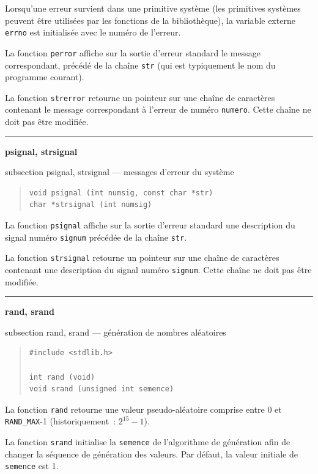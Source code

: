 \documentclass [twoside] {report}
\newcommand {\primitive} [1]
    {
	\phantomsection
	{\large \textbf {#1}}
	\addcontentsline {toc} {subsection} {#1}
    }
\newcommand {\separation}
    {
	\vspace {5mm}
	\nopagebreak
	\hrule
    }
\begin{document}
Lorsqu'une erreur survient dans une primitive système (les
primitives systèmes peuvent être utilisées par les fonctions de la
bibliothèque), la variable externe \texttt {errno} est initialisée avec
le numéro de l'erreur.

La fonction \texttt {perror} affiche sur la sortie d'erreur standard le
message correspondant, précédé de la chaîne \texttt {str} (qui est
typiquement le nom du programme courant).

La fonction \texttt {strerror} retourne un pointeur sur une chaîne de
caractères contenant le message correspondant à l'erreur de numéro
\texttt {numero}. Cette chaîne ne doit pas être modifiée.



\separation 
\primitive {psignal, strsignal} --- messages d'erreur du système

\begin {quote}
\begin {verbatim}
void psignal (int numsig, const char *str)
char *strsignal (int numsig)
\end{verbatim}
\end {quote}

La fonction \texttt {psignal} affiche sur la sortie d'erreur standard une
description du signal numéro \texttt {signum} précédée de la chaîne
\texttt {str}.

La fonction \texttt {strsignal} retourne un pointeur sur une chaîne de
caractères contenant une description du signal numéro \texttt {signum}.
Cette chaîne ne doit pas être modifiée.



\separation 
\primitive {rand, srand} --- génération de nombres aléatoires

\begin {quote}
\begin {verbatim}
#include <stdlib.h>

int rand (void)
void srand (unsigned int semence)
\end{verbatim}
\end {quote}

La fonction \texttt {rand} retourne une valeur pseudo-aléatoire comprise
entre 0 et \texttt {RAND\_MAX}-1 (historiquement~: $2^{15}-1$).

La fonction \texttt {srand} initialise la \texttt {semence} de l'algorithme de
génération afin de changer la séquence de génération des valeurs.
Par défaut, la valeur initiale de \texttt {semence} est 1.
\end{document}
